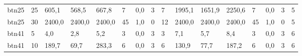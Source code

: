 \begin{table}[]
\begin{tabular}{llllllllllllllll}
		btn25   & 25     & 605,1                                               & 568,5                                               & 667,8                                               & 7                                                   & 0,0                                                 & 3      & 7                                                         & 1995,1                                              & 1651,9                                              & 2250,6                                              & 7                                                   & 0,0                                                 & 3      & 5                                                         \\
		btn25   & 30     & 2400,0                                              & 2400,0                                              & 2400,0                                              & 45                                                  & 1,0                                                 & 0      & 12                                                        & 2400,0                                              & 2400,0                                              & 2400,0                                              & 45                                                  & 1,0                                                 & 0      & 5                                                         \\
		btn41   & 5      & 4,0                                                 & 2,8                                                 & 5,2                                                 & 3                                                   & 0,0                                                 & 3      & 3                                                         & 7,1                                                 & 5,7                                                 & 8,4                                                 & 3                                                   & 0,0                                                 & 3      & 6                                                         \\
		btn41   & 10     & 189,7                                               & 69,7                                                & 283,3                                               & 6                                                   & 0,0                                                 & 3      & 6                                                         & 130,9                                               & 77,7                                                & 187,2                                               & 6                                                   & 0,0                                                 & 3      & 6                                                         \\

\end{tabular}
\end{table}
